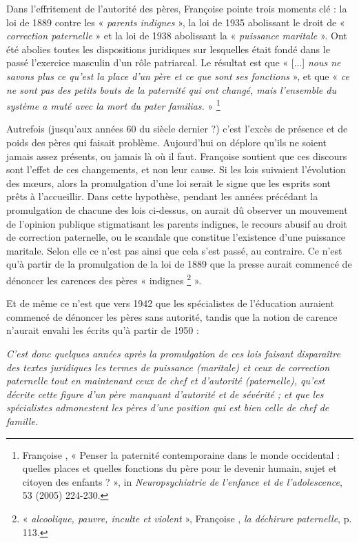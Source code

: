  Dans l'effritement de l'autorité des pères, Françoise  pointe trois moments clé : la loi de 1889 contre les « \emph{parents indignes} », la loi de 1935 abolissant le droit de « \emph{correction paternelle} » et la loi de 1938 abolissant la « \emph{puissance maritale} ». Ont été abolies toutes les dispositions juridiques sur lesquelles était fondé dans le passé l'exercice masculin d'un rôle patriarcal. Le résultat est que « [...] \emph{nous ne savons plus ce qu'est la place d'un père et ce que sont ses fonctions} », et que « \emph{ce ne sont pas des petits bouts de la paternité qui ont changé, mais l'ensemble du système a muté avec la mort du \emph{pater familias}.} »%
\footnote{Françoise , « Penser la paternité contemporaine dans le monde occidental : quelles places et quelles fonctions du père pour le devenir humain, sujet et citoyen des enfants ? », in \emph{Neuropsychiatrie de l'enfance et de l'adolescence}, 53 (2005) 224-230.} 

 Autrefois (jusqu'aux années 60 du siècle dernier ?) c'est l'excès de présence et de poids des pères qui faisait problème. Aujourd'hui on déplore qu'ils ne soient jamais assez présents, ou jamais là où il faut. Françoise  soutient que ces discours sont l'effet de ces changements, et non leur cause. Si les lois suivaient l'évolution des mœurs, alors la promulgation d'une loi serait le signe que les esprits sont prêts à l'accueillir. Dans cette hypothèse, pendant les années précédant la promulgation de chacune des lois ci-dessus, on aurait dû observer un mouvement de l'opinion publique stigmatisant les parents indignes, le recours abusif au droit de correction paternelle, ou le scandale que constitue l'existence d'une puissance maritale. Selon elle ce n'est pas ainsi que cela s'est passé, au contraire. Ce n'est qu'à partir de la promulgation de la loi de 1889 que la presse aurait commencé de dénoncer les carences des pères « indignes%
\footnote{« \emph{alcoolique, pauvre, inculte et violent} », Françoise , \emph{la déchirure paternelle}, p. 113.} 
 ».

 Et de même ce n'est que vers 1942 que les spécialistes de l'éducation auraient commencé de dénoncer les pères sans autorité, tandis que la notion de carence n'aurait envahi les écrits qu'à partir de 1950 :
 
\begin{displayquote}
\emph{C'est donc quelques années après la promulgation de ces lois faisant disparaître des textes juridiques les termes de puissance (maritale) et ceux de correction paternelle tout en maintenant ceux de chef et d'autorité (paternelle), qu'est décrite cette figure d'un père manquant d'autorité et de sévérité ; et que les spécialistes admonestent les pères d'une position qui est bien celle de chef de famille.}
\end{displayquote}

